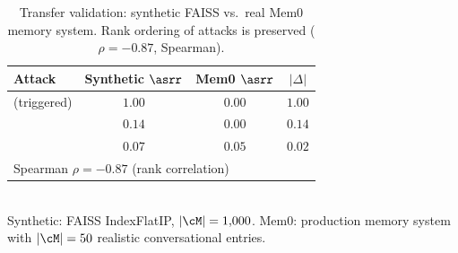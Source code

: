 \begin{table}[t]
  \centering
  \small
  \caption{Transfer validation: synthetic FAISS vs.\ real Mem0 memory system. Rank ordering of attacks is preserved ($\rho = -0.87$, Spearman).}
  \label{tab:mem0_validation}
  \vspace{2pt}
  \begin{tabular}{l cc c}
    \toprule
    Attack & Synthetic $\asrr$ & Mem0 $\asrr$ & $|\Delta|$ \\
    \midrule
    \agentpoison{} (triggered) & $1.00$ & $0.00$ & $1.00$ \\
    \minja{} & $0.14$ & $0.00$ & $0.14$ \\
    \injecmem{} & $0.07$ & $0.05$ & $0.02$ \\
    \midrule
    \multicolumn{4}{l}{\footnotesize Spearman $\rho = -0.87$ (rank correlation)}\\
    \bottomrule
  \end{tabular}
  \\[2pt]
  {\footnotesize Synthetic: FAISS IndexFlatIP, $|\cM|=1{,}000$. Mem0: production memory system with $|\cM|=50$ realistic conversational entries.}
  \vspace{-6pt}
\end{table}
